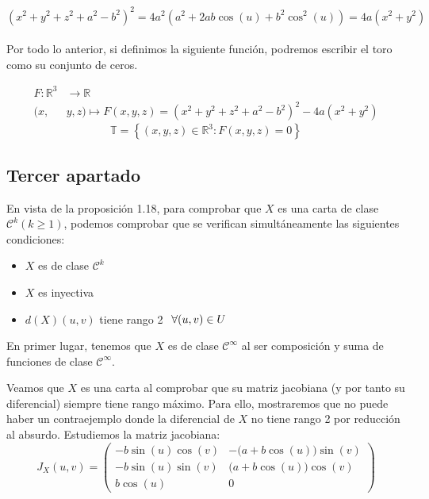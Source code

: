 \documentclass{article}
\begin{document}
$$ (x^2+y^2+z^2+a^2-b^2)^2 = 4a^2(a^2 + 2ab \cos(u) + b^2\cos^2(u)) = 4a(x^2 + y^2)$$
\\ \noindent
Por todo lo anterior, si definimos la siguiente función, podremos escribir el toro como su conjunto de ceros.

$$
    \begin{aligned}
        F: \mathbb{R}^3& \longrightarrow \mathbb{R} \\
        (x,& y, z)  \longmapsto  F(x, y, z)= (x^2+y^2+z^2+a^2-b^2)^2 - 4a(x^2 + y^2)
    \end{aligned}
$$
$$\mathbb{T} = \left\{(x,y,z) \in \mathbb{R}^3 :F(x,y,z) = 0\right\}$$
    

\newpage

\subsection{Tercer apartado}
\hspace{1mm} En vista de la proposición 1.18, para comprobar que $X$ es una carta de clase $\mathcal{C}^k (k\geq1)$,
podemos comprobar que se verifican simultáneamente las siguientes condiciones:
\begin{itemize}
    \item $X$ es de clase $\mathcal{C}^k$
    \item $X$ es inyectiva
    \item $d(X)(u,v) $ tiene rango 2 $ \hspace{1.5mm} \forall (u,v) \in U$
\end{itemize}

\vspace{2mm}
En primer lugar, tenemos que $X$ es de clase $\mathcal{C}^\infty$ al
ser composición y suma de funciones  de clase $\mathcal{C}^\infty$.

\vspace{2mm}
Veamos que $X$ es una carta al comprobar que su matriz jacobiana (y por tanto su diferencial) siempre
tiene rango máximo. Para ello, mostraremos que no puede haber un contraejemplo donde la diferencial
de $X$ no tiene rango 2 por reducción al absurdo. Estudiemos la matriz jacobiana:
\vspace{1mm}
\[
J_X(u,v) =
\begin{pmatrix}
-b \sin(u) \cos(v) & -\big(a + b\cos(u) \big) \sin(v)\\[2ex]
-b \sin(u) \sin(v) & \big(a + b \cos(u) \big) \cos(v)\\[2ex]
b \cos(u) & 0
\end{pmatrix}
\]
\end{document}
